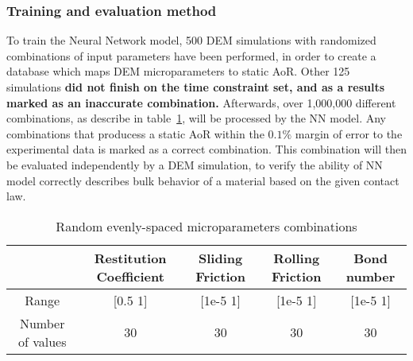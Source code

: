 \subsubsection{Training and evaluation method}  

To train the Neural Network model, 500 DEM simulations with randomized combinations of input parameters have been performed, in order to create a database which maps DEM microparameters to static AoR. Other 125 simulations \textbf{did not finish on the time constraint set, and as a results marked as an inaccurate combination.} Afterwards, over 1,000,000 different combinations, as describe in table~\ref{table:randomCombinations}, will be processed by the NN model. Any combinations that producess a static AoR within the $0.1\%$ margin of error to the experimental data is marked as a correct combination. This combination will then be evaluated independently by a DEM simulation, to verify the ability of NN model correctly describes bulk behavior of a material based on the given contact law. 

\begin{table}[H]
    \centering
    \begin{tabular}{c|cccc}
                     & Restitution Coefficient & Sliding Friction & Rolling Friction & Bond number  \\ \hline
    Range            & {[}0.5 1{]}             & {[}1e-5 1{]}     & {[}1e-5 1{]}     & {[}1e-5 1{]} \\
    Number of values & 30                      & 30               & 30               & 30          
    \end{tabular}
    \caption{Random evenly-spaced microparameters combinations}
    \label{table:randomCombinations}
\end{table}